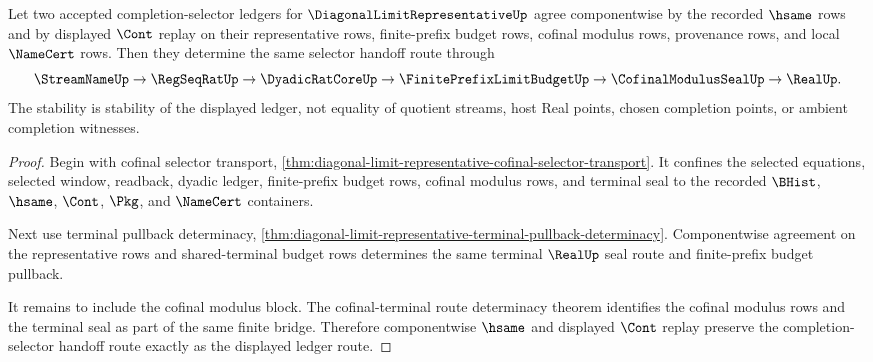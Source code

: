 \begin{theorem}
\label{thm:diagonal-limit-representative-completion-selector-stability}
Let two accepted completion-selector ledgers for $\DiagonalLimitRepresentativeUp$ agree componentwise by the recorded $\hsame$ rows and by displayed $\Cont$ replay on their representative rows, finite-prefix budget rows, cofinal modulus rows, provenance rows, and local $\NameCert$ rows. Then they determine the same selector handoff route through
$$
\StreamNameUp \to \RegSeqRatUp \to \DyadicRatCoreUp \to \FinitePrefixLimitBudgetUp \to \CofinalModulusSealUp \to \RealUp.
$$
The stability is stability of the displayed ledger, not equality of quotient streams, host Real points, chosen completion points, or ambient completion witnesses.
\end{theorem}
\begin{proof}
Begin with cofinal selector transport, \autoref{thm:diagonal-limit-representative-cofinal-selector-transport}. It confines the selected equations, selected window, readback, dyadic ledger, finite-prefix budget rows, cofinal modulus rows, and terminal seal to the recorded $\BHist$, $\hsame$, $\Cont$, $\Pkg$, and $\NameCert$ containers.

Next use terminal pullback determinacy, \autoref{thm:diagonal-limit-representative-terminal-pullback-determinacy}. Componentwise agreement on the representative rows and shared-terminal budget rows determines the same terminal $\RealUp$ seal route and finite-prefix budget pullback.

It remains to include the cofinal modulus block. The cofinal-terminal route determinacy theorem identifies the cofinal modulus rows and the terminal seal as part of the same finite bridge. Therefore componentwise $\hsame$ and displayed $\Cont$ replay preserve the completion-selector handoff route exactly as the displayed ledger route.
\end{proof}

